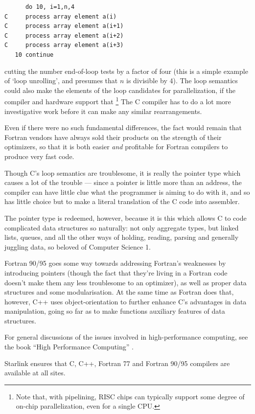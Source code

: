 \documentclass[11pt,oneside,chapters]{starlink}
\begin{document}
\begin{verbatim}
      do 10, i=1,n,4
C     process array element a(i)
C     process array element a(i+1)
C     process array element a(i+2)
C     process array element a(i+3)
   10 continue
\end{verbatim}

cutting the number end-of-loop tests by a factor of four (this is a
simple example of `loop unrolling', and presumes that
$n$ is divisible by 4).  The loop
semantics could also make the elements of the loop
candidates for parallelization, if the compiler and hardware support
that
\footnote{Note that, with pipelining, RISC chips can typically
support some degree of on-chip parallelization, even for a single
CPU.}
The C compiler has to do a lot more investigative work before
it can make any similar rearrangements.

Even if there were no such fundamental differences, the fact would
remain that Fortran vendors have always sold their products on the
strength of their optimizers, so that it is both easier \emph{and}
profitable for Fortran compilers to produce very fast code.

Though C's loop semantics are troublesome, it is really the pointer
type which causes a lot of the trouble --- since a pointer is little
more than an address, the compiler can have little clue what the
programmer is aiming to do with it, and so has little choice but to
make a literal translation of the C code into assembler.

The pointer type is redeemed, however, because it is this which
allows C to code complicated data structures so naturally: not only
aggregate types, but linked lists, queues, and all the other ways of
holding, reading, parsing and generally juggling data, so beloved of
Computer Science 1.

Fortran 90/95 goes some way towards addressing Fortran's
weaknesses by introducing pointers (though the fact that
they're living in a Fortran code doesn't make them any less
troublesome to an optimizer), as well as proper data
structures and some modularisation.  At the same time as
Fortran does that, however, C++ uses object-orientation to
further enhance C's advantages in data manipulation, going
so far as to make functions auxiliary features of data
structures.

For general discussions of the issues involved in high-performance
computing, see the book
``High Performance Computing'' \citep{dowd}.

Starlink ensures that C, C++, Fortran 77 and Fortran 90/95 compilers
are available at all sites.
\end{document}
